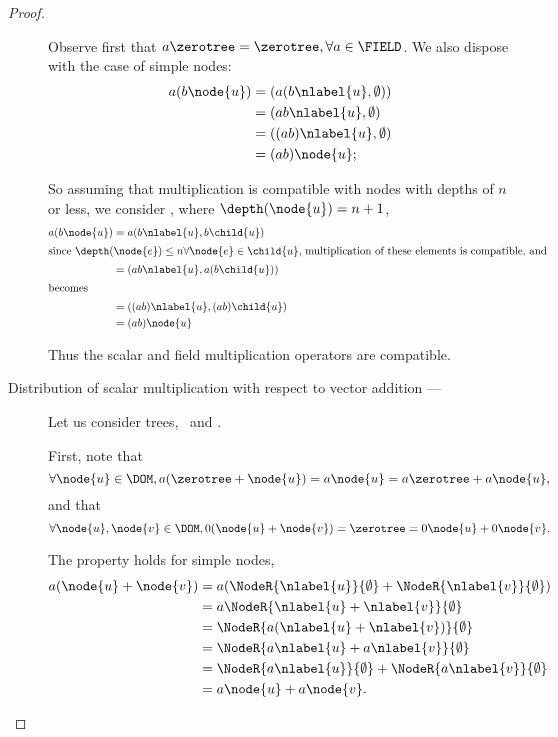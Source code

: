 \begin{proposition}
\begin{proof}
\begin{description}
      Observe first that $a \zerotree = \zerotree, \forall a \in
      \FIELD$. We also dispose with the case of simple nodes:
      \begin{align*}
        a(b \node{u}) &= (a(b \nlabel{u}, \emptyset)) \\
        &= (a b \nlabel{u}, \emptyset) \\
        &= ((a b) \nlabel{u}, \emptyset) \\
        &= (a b) \node{u};
      \end{align*}

      So assuming that multiplication is compatible with nodes with
      depths of $n$ or less, we consider , where $\depth(\node{u})
      = n+1$,
      \begin{align*}
        a (b \node{u}) &= a (b  \nlabel{u}, b\child{u}) \\
        \intertext{since $\depth(\node{e}) \leq n \forall \node{e}\in \child{u},$ multiplication of these elements is compatible, and }
        &= (a b\/ \nlabel{u}, a(b\child{u})) \\
        \intertext{becomes}
        &= ((a b) \nlabel{u}, (a b)\child{u}) \\
        &= (a b) \node{u}
      \end{align*}

      Thus the scalar and field multiplication operators are compatible.

    \item[Distribution of scalar multiplication with respect to vector addition --- ]

      Let us consider trees, \ and .

      First, note that \[\forall \node{u} \in \DOM, a(\zerotree + \node{u}) = a \node{u} = a\zerotree + a \node{u},\]
      and that \[\forall \node{u},\node{v}\in\DOM, 0 (\node{u} + \node{v}) = \zerotree = 0 \node{u} + 0 \node{v}.\]

      The property holds for simple nodes, 
      \begin{align*}
        a(\node{u} + \node{v}) &= a (\NodeR{\nlabel{u}}{\emptyset} + \NodeR{\nlabel{v}}{\emptyset})\\ 
        &= a \NodeR{\nlabel{u} + \nlabel{v}}{\emptyset} \\
        &= \NodeR{a(\nlabel{u} + \nlabel{v})}{\emptyset} \\
        &= \NodeR{a\nlabel{u} + a\nlabel{v}}{\emptyset} \\
        &= \NodeR{a\nlabel{u}}{\emptyset} + \NodeR{a\nlabel{v}}{\emptyset} \\
        &= a \node{u} + a \node{v}.
      \end{align*}


\end{description}
\end{proof}
\end{proposition}
